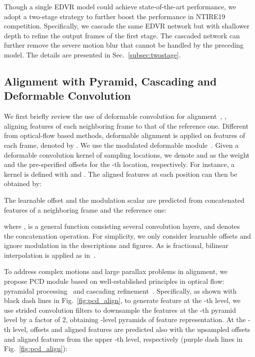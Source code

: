 \documentclass[10pt,twocolumn,letterpaper]{article}
\begin{document}
Though a single EDVR model could achieve state-of-the-art performance, we adopt a two-stage strategy to further boost the performance in NTIRE19 competition. Specifically, we cascade the same EDVR network but with shallower depth to refine the output frames of the first stage.
The cascaded network can further remove the severe motion blur that cannot be handled by the preceding model.
The details are presented in Sec.~\ref{subsec:twostage}.

\subsection{Alignment with Pyramid, Cascading and\\Deformable Convolution}
\label{subsec:pcd}


We first briefly review the use of deformable convolution for alignment~\cite{tian2018tdan}, \ie, aligning features of each neighboring frame to that of the reference one.
Different from optical-flow based methods, deformable alignment is applied on features of each frame, denoted by .
We use the modulated deformable module~\cite{zhu2018deformable}. Given a deformable convolution kernel of  sampling locations, we denote  and  as the weight and the pre-specified offsets for the -th location, respectively. For instance, a  kernel is defined with  and .
The aligned features  at each position  can then be obtained by:
\vspace{-0.2cm}

The learnable offset  and the modulation scalar  are predicted from concatenated features of a neighboring frame and the reference one: \vspace{-0.1cm}

where ,  is a general function consisting several convolution layers, and  denotes the concatenation operation. For simplicity, we only consider learnable offsets  and ignore modulation  in the descriptions and figures. 
As  is fractional, bilinear interpolation is applied as in~\cite{dai2017deformable}.

To address complex motions and large parallax problems in alignment, we propose PCD module based on well-established principles in optical flow: pyramidal processing~\cite{ranjan2016optical,sun2018pwc} and cascading refinement~\cite{hui18liteflownet,hui2019lightweight,ilg2017flownet}.
Specifically, as shown with black dash lines in Fig.~\ref{fig:pcd_align}, to generate feature  at the -th level, we use strided convolution filters to downsample the features at the -th pyramid level by a factor of 2, obtaining -level pyramids of feature representation.
At the -th level, offsets and aligned features are predicted also with the  upsampled offsets and aligned features from the upper -th level, respectively (purple dash lines in Fig.~\ref{fig:pcd_align}):
\vspace{-0.3cm}
\end{document}
